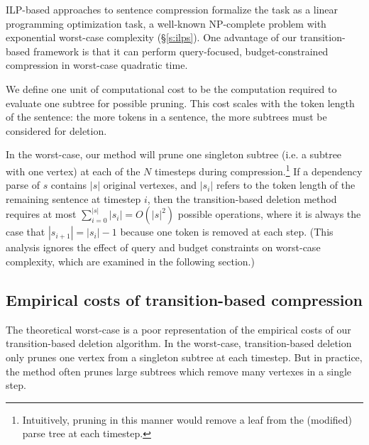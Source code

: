 \documentclass[11pt,a4paper]{article}
\begin{document}
ILP-based approaches to sentence compression formalize the task as a linear programming optimization task, a well-known NP-complete problem with exponential worst-case complexity (\S\ref{s:ilps}). One advantage of our transition-based framework is that it can perform query-focused, budget-constrained compression in worst-case quadratic time. 

We define one unit of computational cost to be the computation required to evaluate one subtree for possible pruning. This cost scales with the token length of the sentence: the more tokens in a sentence, the more subtrees must be considered for deletion.  %

In the worst-case, our method will prune one singleton subtree (i.e. a subtree with one vertex) at each of the $N$ timesteps during compression.\footnote{Intuitively, pruning in this manner would remove a leaf from the (modified) parse tree at each timestep.} If a dependency parse of $s$ contains $|s|$ original vertexes, and $|s_i|$ refers to the token length of the remaining sentence at timestep $i$, then the transition-based deletion method requires at most ${\sum_{i = 0}^{|s|} |s_i | = O(|s|^2)}$ possible operations, where it is always the case that $|s_{i + 1}| = |s_{i}|  - 1$ because one token is removed at each step. (This analysis ignores the effect of query and budget constraints on worst-case complexity, which are examined in the following section.)

\subsection{Empirical costs of transition-based compression}\label{s:empiricalcost}

The theoretical worst-case is a poor representation of the empirical costs of our transition-based deletion algorithm. In the worst-case, transition-based deletion only prunes one vertex from a singleton subtree at each timestep. But in practice, the method often prunes large subtrees which remove many vertexes in a single step. 

\end{document}
